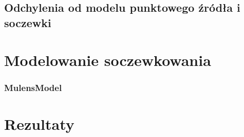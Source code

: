 \documentclass{beamer}
\begin{document}
\subsection{Odchylenia od modelu punktowego źródła i soczewki}

\section{Modelowanie soczewkowania}
\subsubsection{MulensModel}

\section{Rezultaty}
\end{document}
